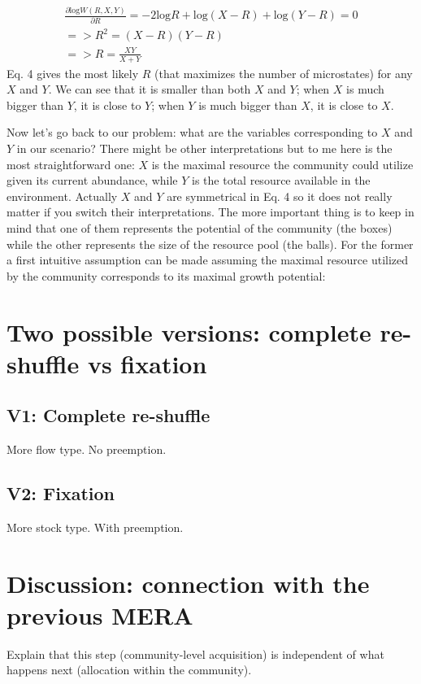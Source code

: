 \documentclass[12pt]{article}
\begin{document}
  \begin{equation}
 \begin{split}
\frac{\partial \mbox{log} W(R,X,Y)}{\partial R} =  - 2 \mbox{log} R + \mbox{log} (X-R) + \mbox{log} (Y-R) = 0\\
=> R^2 = (X-R)(Y-R)\\
=> R = \frac{XY}{X+Y}
\end{split}
\end{equation}
Eq. 4 gives the most likely $R$ (that maximizes the number of microstates) for any $X$ and $Y$. We can see that it is smaller than both $X$ and $Y$; when $X$ is much bigger than $Y$, it is close to $Y$; when $Y$ is much bigger than $X$, it is close to $X$.

Now let's go back to our problem: what are the variables corresponding to $X$ and $Y$ in our scenario? There might be other interpretations but to me here is the most straightforward one: $X$ is the maximal resource the community could utilize given its current abundance, while $Y$ is the total resource available in the environment. Actually $X$ and $Y$ are symmetrical in Eq. 4 so it does not really matter if you switch their interpretations. The more important thing is to keep in mind that one of them represents  the potential of the community (the boxes) while the other represents the size of the resource pool (the balls). For the former a first intuitive assumption can be made assuming the maximal resource utilized by the community corresponds to its maximal growth potential:

\section{Two possible versions: complete re-shuffle vs fixation}
\subsection{V1: Complete re-shuffle}
More flow type. No preemption.
\subsection{V2: Fixation}
More stock type. With preemption.
 
\section{Discussion: connection with the previous MERA}
Explain that this step (community-level acquisition) is independent of what happens next (allocation within the community).
\end{document}

